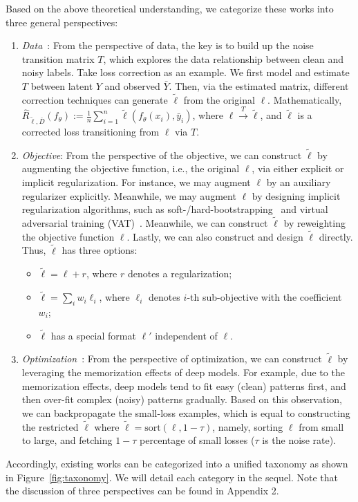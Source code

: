 \label{sec:taxonomy}
Based on the above theoretical understanding, we categorize these works into three general perspectives:
\begin{enumerate}[leftmargin=*]
\item \textit{Data}~: 
From the perspective of data, 
the key is to build up the noise transition matrix $T$, which explores the data relationship between clean and noisy labels. Take loss correction as an example. We first model and estimate $T$ between latent $Y$ and observed $\bar{Y}$. Then, via the estimated matrix, different correction techniques can generate $\tilde{\ell}$ from the original $\ell$. 
Mathematically, 
$\widehat{R}_{\tilde{\ell},\bar{D}}(f_{\theta}) := \frac{1}{n}\sum_{i=1}^n \tilde{\ell}(f_{\theta}(x_i), \bar{y}_i)$,
where 
$\ell \xrightarrow{T} \tilde{\ell}$, and $\tilde{\ell}$ is a corrected loss transitioning from $\ell$ via $T$.
\item \textit{Objective}: From the perspective of the objective, we can construct $\tilde{\ell}$ by augmenting the objective function, 
i.e., the original $\ell$, 
via either explicit or implicit regularization.
For instance, we may augment $\ell$ by an auxiliary regularizer explicitly. Meanwhile, we may augment $\ell$ by designing implicit regularization algorithms, such as soft-/hard-bootstrapping~
and virtual adversarial training (VAT)~. 
Meanwhile, we can construct $\tilde{\ell}$ by reweighting the objective function $\ell$. Lastly, we can also construct and design $\tilde{\ell}$ directly. Thus, $\tilde{\ell}$ has three options:
\begin{itemize}
\item $\tilde{\ell} = \ell + r$, where $r$ denotes a regularization; 
\item $\tilde{\ell} = \sum_i w_i\ell_i$, where $\ell_i$ denotes $i$-th sub-objective 
with the coefficient $w_i$; 
\item $\tilde{\ell}$ has a special format $\ell'$ independent of $\ell$.
\end{itemize}
\item \textit{Optimization}~: From the perspective of optimization, we can construct $\tilde{\ell}$ by leveraging the memorization effects of deep models. For example, due to the memorization effects, deep models tend to fit easy (clean) patterns first, and then over-fit complex (noisy) patterns gradually. Based on this observation, we can backpropagate the small-loss examples, which is equal to constructing the restricted $\tilde{\ell}$
where $\tilde{\ell} = \text{sort}(\ell,1-\tau)$, namely, sorting $\ell$ from small to large, and fetching $1-\tau$ percentage of small losses ($\tau$ is the noise rate).
\end{enumerate}
Accordingly, existing works can be categorized into a unified taxonomy as shown in Figure~\ref{fig:taxonomy}. 
We will detail each category in the sequel. Note that the discussion of three perspectives can be found in Appendix 2.

